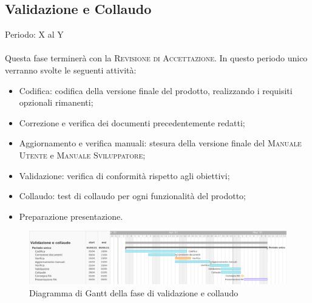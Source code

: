 \documentclass[../piano_di_progetto.tex]{subfiles}
\begin{document}

\subsection{Validazione e Collaudo}%
\label{sub:valid_coll}
Periodo: X al Y \\ \\ 
Questa fase terminerà con la \textsc{Revisione di Accettazione}. In questo periodo unico verranno svolte le seguenti attività:

\begin{itemize}
    \item Codifica: codifica della versione finale del prodotto, realizzando i requisiti opzionali rimanenti;
    \item Correzione e verifica dei documenti precedentemente redatti;
    \item Aggiornamento e verifica manuali: stesura della versione finale del \textsc{Manuale Utente} e \textsc{Manuale Sviluppatore};
    \item Validazione: verifica di conformità rispetto agli obiettivi;
    \item Collaudo: test di collaudo per ogni funzionalità del prodotto;
    \item Preparazione presentazione.
\end{itemize}


\begin{figure}[H]
\centering
\includegraphics[width=18cm]{src/img/gantt/04_RA_alternative.png}
\caption{Diagramma di Gantt della fase di validazione e collaudo}
\end{figure}
\end{document}
